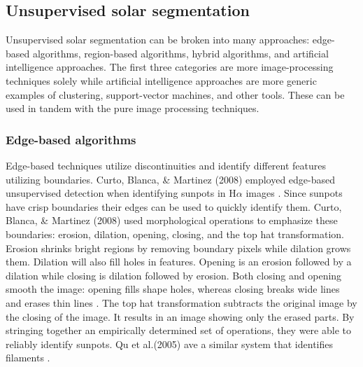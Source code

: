 \documentclass[twoside]{report}
\begin{document}
\subsection{Unsupervised solar segmentation} \label{sec:unsupervised}
Unsupervised solar segmentation can be broken into many approaches: edge-based algorithms, region-based algorithms, hybrid algorithms, and artificial intelligence approaches. The first three categories are more image-processing techniques solely while artificial intelligence approaches are more generic examples of clustering, support-vector machines, and other tools. These can be used in tandem with the pure image processing techniques. 

\subsubsection{Edge-based algorithms}
Edge-based techniques utilize discontinuities and identify different features utilizing boundaries. Curto, Blanca, \& Martinez (2008) employed edge-based unsupervised detection when identifying sunpots in H$\alpha$ images \cite{curto2008automatic}. Since sunpots have crisp boundaries their edges can be used to quickly identify them. Curto, Blanca, \& Martinez (2008) used morphological operations to emphasize these boundaries: erosion, dilation, opening, closing, and the top hat transformation. Erosion shrinks bright regions by removing boundary pixels while dilation grows them. Dilation will also fill holes in features. Opening is an erosion followed by a dilation while closing is dilation followed by erosion. Both closing and opening smooth the image: opening fills shape holes, whereas closing breaks wide lines and erases thin lines \cite{curto2008automatic}. The top hat transformation subtracts the original image by the closing of the image. It results in an image showing only the erased parts. By stringing together an empirically determined set of operations, they were able to reliably identify sunpots. Qu et al.(2005) ave a similar system that identifies filaments \cite{qu2005automatic}. 
\end{document}
